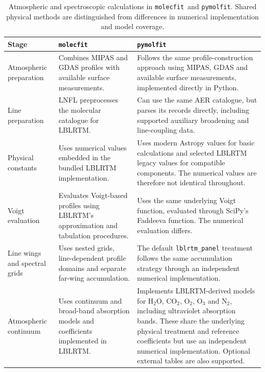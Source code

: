 \documentclass{aa}
\newcommand{\molecfit}{{\texttt{molecfit}}}
\newcommand{\pymolfit}{\texttt{pymolfit}}
\begin{document}
\begin{table}[h]
\centering
\caption{Atmospheric and spectroscopic calculations in \molecfit\ and \pymolfit. Shared physical methods are distinguished from differences in numerical implementation and model coverage.}
\label{tab:physical_implementation}
\small
\renewcommand{\arraystretch}{1.15}
\begin{tabularx}{\textwidth}{@{}p{}XX@{}}
\toprule
Stage & \molecfit\ & \pymolfit\ \\
\midrule
Atmospheric preparation & Combines MIPAS and GDAS profiles with available surface measurements. & Follows the same profile-construction approach using MIPAS, GDAS and available surface measurements, implemented directly in Python. \\
Line preparation & LNFL preprocesses the molecular catalogue for LBLRTM. & Can use the same AER catalogue, but parses its records directly, including supported auxiliary broadening and line-coupling data. \\
Physical constants & Uses numerical values embedded in the bundled LBLRTM implementation. & Uses modern Astropy values for basic calculations and selected LBLRTM legacy values for compatible components. The numerical values are therefore not identical throughout. \\
Voigt evaluation & Evaluates Voigt-based profiles using LBLRTM's approximation and tabulation procedures. & Uses the same underlying Voigt function, evaluated through SciPy's Faddeeva function. The numerical evaluation differs. \\
Line wings and spectral grids & Uses nested grids, line-dependent profile domains and separate far-wing accumulation. & The default \texttt{lblrtm\_panel} treatment follows the same accumulation strategy through an independent numerical implementation. \\
Atmospheric continuum & Uses continuum and broad-band absorption models and coefficients implemented in LBLRTM. & Implements LBLRTM-derived models for H$_2$O, CO$_2$, O$_2$, O$_3$ and N$_2$, including ultraviolet absorption bands. These share the underlying physical treatment and reference coefficients but use an independent numerical implementation. Optional external tables are also supported. \\
\bottomrule
\end{tabularx}
\end{table}
\end{document}
